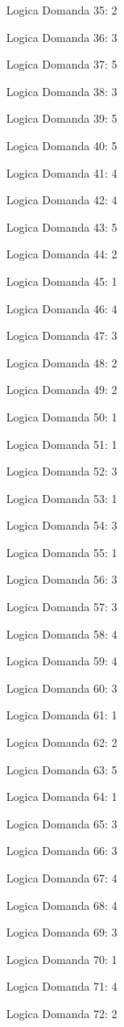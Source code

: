\documentclass[20pt, a4paper]{article}
\begin{document}
\begin{itemize}[leftmargin=*]
\item [Logica] Domanda 35: 2
\item [Logica] Domanda 36: 3
\item [Logica] Domanda 37: 5
\item [Logica] Domanda 38: 3
\item [Logica] Domanda 39: 5
\item [Logica] Domanda 40: 5
\item [Logica] Domanda 41: 4
\item [Logica] Domanda 42: 4
\item [Logica] Domanda 43: 5
\item [Logica] Domanda 44: 2
\item [Logica] Domanda 45: 1
\item [Logica] Domanda 46: 4
\item [Logica] Domanda 47: 3
\item [Logica] Domanda 48: 2
\item [Logica] Domanda 49: 2
\item [Logica] Domanda 50: 1
\item [Logica] Domanda 51: 1
\item [Logica] Domanda 52: 3
\item [Logica] Domanda 53: 1
\item [Logica] Domanda 54: 3
\item [Logica] Domanda 55: 1
\item [Logica] Domanda 56: 3
\item [Logica] Domanda 57: 3
\item [Logica] Domanda 58: 4
\item [Logica] Domanda 59: 4
\item [Logica] Domanda 60: 3
\item [Logica] Domanda 61: 1
\item [Logica] Domanda 62: 2
\item [Logica] Domanda 63: 5
\item [Logica] Domanda 64: 1
\item [Logica] Domanda 65: 3
\item [Logica] Domanda 66: 3
\item [Logica] Domanda 67: 4
\item [Logica] Domanda 68: 4
\item [Logica] Domanda 69: 3
\item [Logica] Domanda 70: 1
\item [Logica] Domanda 71: 4
\item [Logica] Domanda 72: 2

\end{itemize}
\end{document}
